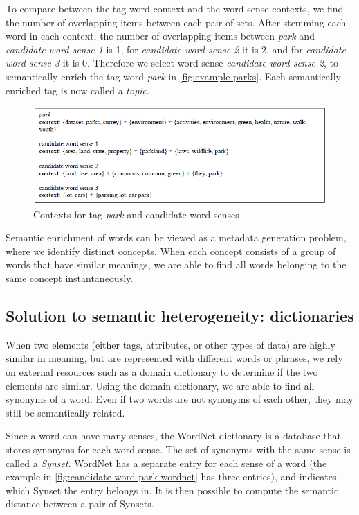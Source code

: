 To compare between the tag word context and the word sense contexts, we find the number of overlapping items between each pair of sets. After stemming each word in each context, the number of overlapping items between \textit{park} and \textit{candidate word sense 1} is 1, for \textit{candidate word sense 2} it is 2, and for \textit{candidate word sense 3} it is 0. Therefore we select word sense \textit{candidate word sense 2}, to semantically enrich the tag word \textit{park} in \autoref{fig:example-parks}. Each semantically enriched tag is now called a \textit{topic}.

\begin{figure}
    \centering
    \includegraphics[width=5in]{figures/contexts-park-candidate.png}
    \caption{Contexts for tag \textit{park} and candidate word senses}
    \label{fig:contexts-park-candidate}
\end{figure}

Semantic enrichment of words can be viewed as a metadata generation problem, where we identify distinct concepts. When each concept consists of a group of words that have similar meanings, we are able to find all words belonging to the same concept instantaneously.

\subsection{Solution to semantic heterogeneity: dictionaries}
\label{ssec:SolutionToSemanticHeterogeneityDdictionaries}

When two elements (either tags, attributes, or other types of data) are highly similar in meaning, but are represented with different words or phrases, we rely on external resources such as a domain dictionary to determine if the two elements are similar. Using the domain dictionary, we are able to find all synonyms of a word. Even if two words are not synonyms of each other, they may still be semantically related.

Since a word can have many senses, the WordNet dictionary is a database that stores synonyms for each word sense. The set of synonyms with the same sense is called a \textit{Synset}. WordNet has a separate entry for each sense of a word (the example in \autoref{fig:candidate-word-park-wordnet} has three entries), and indicates which Synset the entry belongs in. It is then possible to compute the semantic distance between a pair of Synsets.

